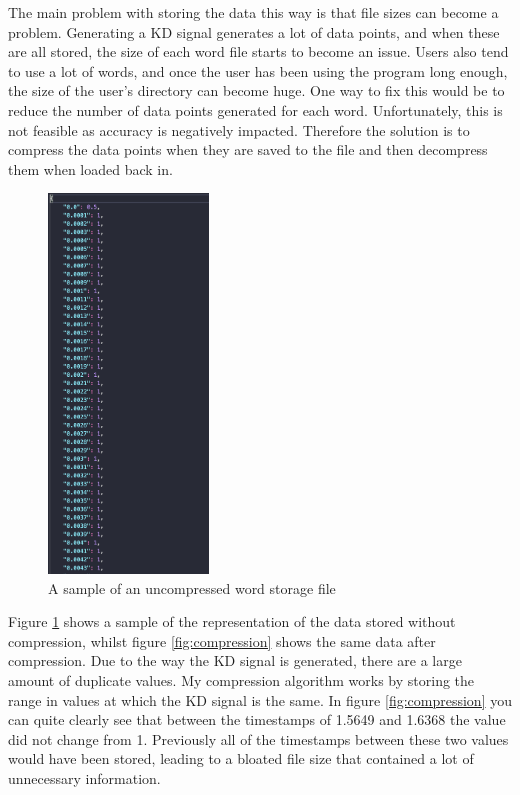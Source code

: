 \documentclass[10pt,a4paper]{report}
\begin{document}
The main problem with storing the data this way is that file sizes can become a problem. Generating a KD signal generates a lot of data points, and when these are all stored, the size of each word file starts to become an issue. Users also tend to use a lot of words, and once the user has been using the program long enough, the size of the user’s directory can become huge. One way to fix this would be to reduce the number of data points generated for each word. Unfortunately, this is not feasible as accuracy is negatively impacted. Therefore the solution is to compress the data points when they are saved to the file and then decompress them when loaded back in.

\begin{figure}
	\begin{center}
		\includegraphics[width=0.38\textwidth]{UncompressedData}
	\end{center}
	\caption{A sample of an uncompressed word storage file}
	\label{fig:uncomp}
\end{figure}

Figure \ref{fig:uncomp} shows a sample of the representation of the data stored without compression, whilst figure \ref{fig:compression} shows the same data after compression. Due to the way the KD signal is generated, there are a large amount of duplicate values. My compression algorithm works by storing the range in values at which the KD signal is the same. In figure \ref{fig:compression} you can quite clearly see that between the timestamps of 1.5649 and 1.6368 the value did not change from 1. Previously all of the timestamps between these two values would have been stored, leading to a bloated file size that contained a lot of unnecessary information.
\end{document}
